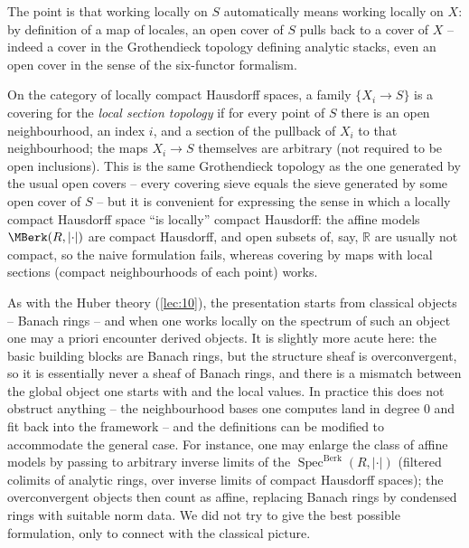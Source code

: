 The point is that working locally on $S$ automatically means working locally on
$X$: by definition of a map of locales, an open cover of $S$ pulls back to a
cover of $X$ -- indeed a cover in the Grothendieck topology defining analytic
stacks, even an open cover in the sense of the six-functor formalism.

\begin{notation}
\label{not:23:local-section}
On the category of locally compact Hausdorff spaces, a family $\{X_i\to S\}$ is a
covering for the \emph{local section topology} if for every point of $S$ there is
an open neighbourhood, an index $i$, and a section of the pullback of $X_i$ to
that neighbourhood; the maps $X_i\to S$ themselves are arbitrary (not required to
be open inclusions). This is the same Grothendieck topology as the one generated
by the usual open covers -- every covering sieve equals the sieve generated by
some open cover of $S$ -- but it is convenient for expressing the sense in which
a locally compact Hausdorff space ``is locally'' compact Hausdorff: the affine
models $\MBerk(R,\lvert\cdot\rvert)$ are compact Hausdorff, and open subsets of,
say, $\mathbb R$ are usually not compact, so the naive formulation fails, whereas
covering by maps with local sections (compact neighbourhoods of each point) works.
\end{notation}

\begin{remark}
\label{rmk:23:derived-subtlety}
As with the Huber theory (\cref{lec:10}), the presentation starts from classical
objects -- Banach rings -- and when one works locally on the spectrum of such
an object one may a priori encounter derived objects. It is slightly more acute
here: the basic building blocks are Banach rings, but the structure sheaf is
overconvergent, so it is essentially never a sheaf of Banach rings, and there is
a mismatch between the global object one starts with and the local values. In
practice this does not obstruct anything -- the neighbourhood bases one computes
land in degree $0$ and fit back into the framework -- and the definitions can be
modified to accommodate the general case. For instance, one may enlarge the class
of affine models by passing to arbitrary inverse limits of the
$\operatorname{Spec}^{\mathrm{Berk}}(R,\lvert\cdot\rvert)$ (filtered colimits of
analytic rings, over inverse limits of compact Hausdorff spaces); the
overconvergent objects then count as affine, replacing Banach rings by condensed
rings with suitable norm data. We did not try to give the best possible
formulation, only to connect with the classical picture.
\end{remark}
